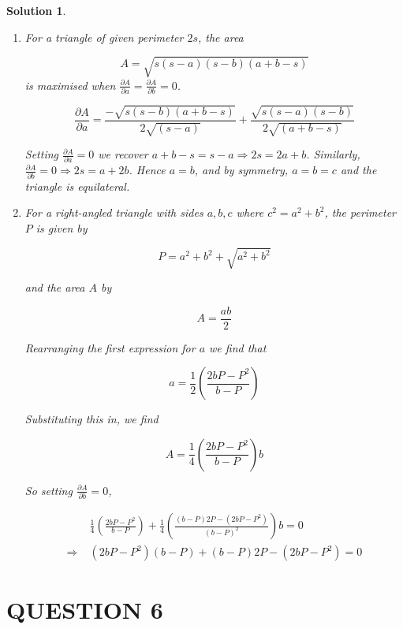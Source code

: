 \documentclass[a4paper]{article}
\newtheorem*{soln}{Solution}
\begin{document}
\begin{soln}
	
	\begin{enumerate}
		\item For a triangle of given perimeter $ 2s $, the area
		
		\[ A = \sqrt{s(s-a)(s-b)(a+b-s)} \] is maximised when $ \frac{\partial A }{\partial a} = \frac{\partial A }{\partial b} = 0 $.
		
		\[ \frac{\partial A }{\partial a} = \frac{-\sqrt{s(s-b)(a+b-s)} }{2\sqrt{(s-a)}} + \frac{\sqrt{s(s-a)(s-b)}}{2\sqrt{(a+b-s)}}\]
		
		Setting $ \frac{\partial A }{\partial a} = 0 $ we recover $ a + b - s = s - a \Rightarrow 2s = 2a + b $. Similarly, $ \frac{\partial A }{\partial b} = 0 \Rightarrow 2s = a + 2b $. Hence $ a = b $, and by symmetry, $ a = b = c $ and the triangle is equilateral.
		
		
		\item For a right-angled triangle with sides $ a,b,c $ where $ c^{2} = a^{2} + b^{2} $, the perimeter $ P $ is given by
		
		\[ P = a^{2} + b^{2} + \sqrt{a^{2} + b^{2}} \]
		
		and the area $ A $ by
		
		\[ A = \frac{ab}{2} \]
		
		Rearranging the first expression for $ a $ we find that
		
		\[ a = \frac{1}{2} \left( \frac{2bP-P^{2}}{b - P} \right)  \]
		
		Substituting this in, we find
		
		\[ A = \frac{1}{4} \left(  \frac{2bP - P^{2}}{b - P} \right) b   \]
		
		So setting $ \frac{\partial A }{\partial b} = 0 $,
		
		\begin{align*}
		& \frac{1}{4} \left(  \frac{2bP - P^{2}}{b - P} \right) + \frac{1}{4} \left(  \frac{(b - P)2P - (2bP - P^{2})}{(b-P)^{2}}  \right) b = 0   \\
		\Rightarrow \; & (2bP - P^{2})(b - P) + (b - P)2P - (2bP - P^{2}) = 0
		\end{align*}
		
		
	\end{enumerate}
	
	

\end{soln}

\section{QUESTION 6}
\end{document}
